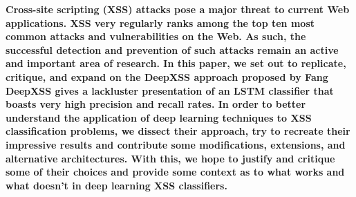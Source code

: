 \textbf{Cross-site scripting (XSS) attacks pose a major threat to current Web applications. XSS very regularly ranks among the top ten most common attacks and vulnerabilities on the Web. As such, the successful detection and prevention of such attacks remain an active and important area of research. In this paper, we set out to replicate, critique, and expand on the DeepXSS approach proposed by Fang  DeepXSS gives a lackluster presentation of an LSTM classifier that boasts very high precision and recall rates. In order to better understand the application of deep learning techniques to XSS classification problems, we dissect their approach, try to recreate their impressive results and contribute some modifications, extensions, and alternative architectures. With this, we hope to justify and critique some of their choices and provide some context as to what works and what doesn't in deep learning XSS classifiers.}
